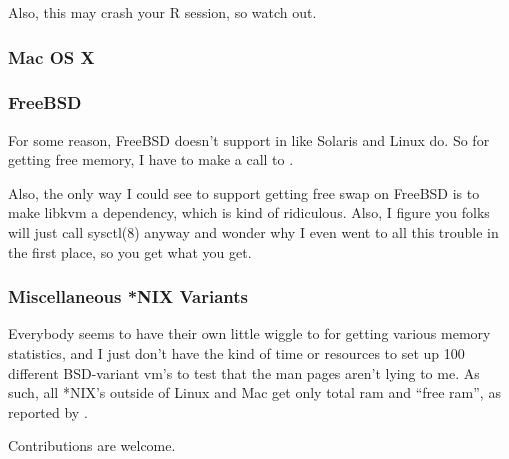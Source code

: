 Also, this may crash your R session, so watch out.





\subsubsection{Mac OS X}






\subsubsection{FreeBSD}

For some reason, FreeBSD doesn't support  in  like Solaris and Linux do.  So for getting free memory, I have to make a call to .

Also, the only way I could see to support getting free swap on FreeBSD is to make libkvm a dependency, which is kind of ridiculous.  Also, I figure you folks will just call sysctl(8) anyway and wonder why I even went to all this trouble in the first place, so you get what you get.



\subsubsection{Miscellaneous *NIX Variants}

Everybody seems to have their own little wiggle to  for getting various memory statistics, and I just don't have the kind of time or resources to set up 100 different BSD-variant vm's to test that the man pages aren't lying to me.  As such, all *NIX's outside of Linux and Mac get only total ram and ``free ram'', as reported by .

Contributions are welcome.


